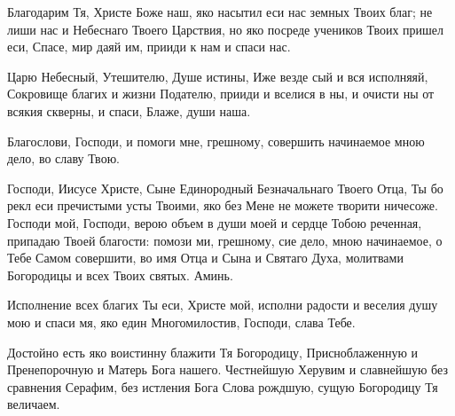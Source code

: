 \mychapterending


\begin{mymulticols}



Благодарим Тя, Христе Боже наш, яко насытил еси нас земных Твоих благ; не лиши нас и Небеснаго Твоего Царствия, но яко посреде учеников Твоих пришел еси, Спасе, мир даяй им, прииди к нам и спаси нас.

\end{mymulticols}

\mychapterending


\begin{mymulticols}




Царю Небесный, Утешителю, Душе истины, Иже везде сый и вся исполняяй, Сокровище благих и жизни Подателю, прииди и вселися в ны, и очисти ны от всякия скверны, и спаси, Блаже, души наша.


    Благослови, Господи, и помоги мне, грешному, совершить начинаемое мною дело, во славу Твою.


    Господи, Иисусе Христе, Сыне Единородный Безначальнаго Твоего Отца, Ты бо рекл еси пречистыми усты Твоими, яко без Мене не можете творити ничесоже. Господи мой, Господи, верою объем в души моей и сердце Тобою реченная, припадаю Твоей благости: помози ми, грешному, сие дело, мною начинаемое, о Тебе Самом совершити, во имя Отца и Сына и Святаго Духа, молитвами Богородицы и всех Твоих святых. Аминь.

\end{mymulticols}

\mychapterending


\begin{mymulticols}




Исполнение всех благих Ты еси, Христе мой, исполни радости и веселия душу мою и спаси мя, яко един Многомилостив, Господи, слава Тебе.


Достойно есть яко воистинну блажити Тя Богородицу, Присноблаженную и Пренепорочную и Матерь Бога нашего. Честнейшую Херувим и славнейшую без сравнения Серафим, без истления Бога Слова рождшую, сущую Богородицу Тя величаем.

\end{mymulticols}

